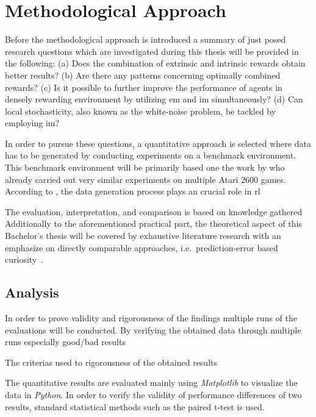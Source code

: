 \documentclass[draft,final]{vutinfth} %
\begin{document}
    \section{Methodological Approach}\label{sec:methodological-approach}

    Before the methodological approach is introduced a summary of just posed research questions which are investigated during this thesis will be provided in the following: (a) Does the combination of extrinsic and intrinsic rewards obtain better results? (b) Are there any patterns concerning optimally combined rewards? (c) Is it possible to further improve the performance of agents in densely rewarding environment by utilizing \gls{em} and \gls{im} simultaneously? (d) Can local stochasticity, also known as the white-noise problem, be tackled by employing \gls{im}?

    In order to pursue these questions, a quantitative approach is selected where data has to be generated by conducting experiments on a benchmark environment.
    This benchmark environment will be primarily based one the work by \citet{burda_large-scale_2018-1} who already carried out very similar experiments on multiple Atari 2600 games.
    According to \citeauthor{francois-lavet_introduction_2018}, the data generation process plays an crucial role in \gls{rl}

    The evaluation, interpretation, and comparison is based on knowledge gathered
    Additionally to the aforementioned practical part, the theoretical aspect of this Bachelor's thesis will be covered by exhaustive literature research with an emphasize on directly comparable approaches, i.e.\ prediction-error based curiosity~\citep{burda_large-scale_2018-1}.

    \subsection{Analysis}
    In order to prove validity and rigorousness of the findings multiple runs of the evaluations will be conducted.
    By verifying the obtained data through multiple runs especially good/bad results

    The criterias used to rigorousness of the obtained results

    The quantitative results are evaluated mainly using \textit{Matplotlib} to visualize the data in \textit{Python}.
    In order to verify the validity of performance differences of two results, standard statistical methods such as the paired t-test is used.
\end{document}
